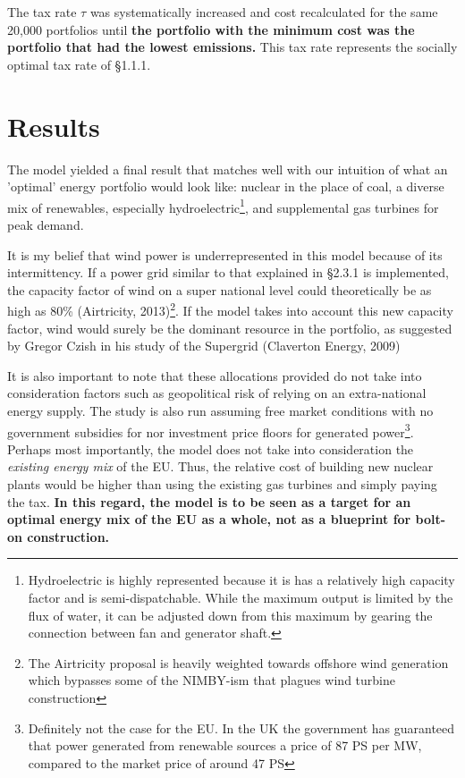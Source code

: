 \documentclass{article}
\begin{document}
The tax rate $\tau$ was systematically increased and cost recalculated for the same 20,000 portfolios until {\bf the portfolio with the minimum cost was the portfolio that had the lowest emissions.} This tax rate represents the socially optimal tax rate of \S{1.1.1}.

\section{Results}
The model yielded a final result that matches well with our intuition of what an 'optimal' energy portfolio would look like: nuclear in the place of coal, a diverse mix of renewables, especially hydroelectric\footnote{Hydroelectric is highly represented because it is has a relatively high capacity factor and is semi-dispatchable. While the maximum output is limited by the flux of water, it can be adjusted down from this maximum by gearing the connection between fan and generator shaft.}, and supplemental gas turbines for peak demand. \*

It is my belief that wind power is underrepresented in this model because of its intermittency. If a power grid similar to that explained in \S{2.3.1} is implemented, the capacity factor of wind on a super national level could theoretically be as high as 80\% (Airtricity, 2013)\footnote{The Airtricity proposal is heavily weighted towards offshore wind generation which bypasses some of the NIMBY-ism that plagues wind turbine construction}. If the model takes into account this new capacity factor, wind would surely be the dominant resource in the portfolio, as suggested by Gregor Czish in his study of the Supergrid (Claverton Energy, 2009)\*

It is also important to note that these allocations provided do not take into consideration factors such as geopolitical risk of relying on an extra-national energy supply. The study is also run assuming free market conditions with no government subsidies for nor investment price floors for generated power\footnote{Definitely not the case for the EU. In the UK the government has guaranteed that power generated from renewable sources a price of 87 PS per MW, compared to the market price of around 47 PS}. Perhaps most importantly, the model does not take into consideration the \emph{existing energy mix} of the EU. Thus, the relative cost of building new nuclear plants would be higher than using the existing gas turbines and simply paying the tax. {\bf In this regard, the model is to be seen as a target for an optimal energy mix of the EU as a whole, not as a blueprint for bolt-on construction. }
\end{document}
